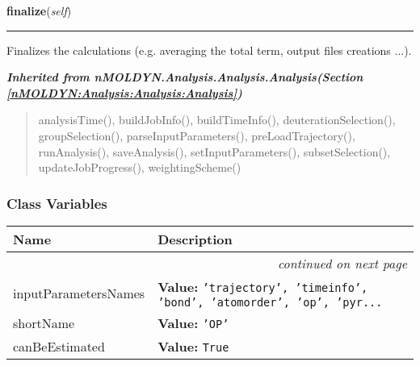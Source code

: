     \label{nMOLDYN:Analysis:NMR:OrderParameter:finalize}

    \vspace{0.5ex}

\hspace{.8\funcindent}\begin{boxedminipage}{\funcwidth}

    \raggedright \textbf{finalize}(\textit{self})

    \vspace{-1.5ex}

    \rule{\textwidth}{0.5\fboxrule}
\setlength{\parskip}{2ex}
    Finalizes the calculations (e.g. averaging the total term, output files
    creations ...).

\setlength{\parskip}{1ex}
    \end{boxedminipage}


\large{\textbf{\textit{Inherited from nMOLDYN.Analysis.Analysis.Analysis\textit{(Section \ref{nMOLDYN:Analysis:Analysis:Analysis})}}}}

\begin{quote}
analysisTime(), buildJobInfo(), buildTimeInfo(), deuterationSelection(), groupSelection(), parseInputParameters(), preLoadTrajectory(), runAnalysis(), saveAnalysis(), setInputParameters(), subsetSelection(), updateJobProgress(), weightingScheme()
\end{quote}


  \subsubsection{Class Variables}

    \vspace{-1cm}
\hspace{\varindent}\begin{longtable}{|p{\varnamewidth}|p{\vardescrwidth}|l}
\cline{1-2}
\cline{1-2} \centering \textbf{Name} & \centering \textbf{Description}& \\
\cline{1-2}
\endhead\cline{1-2}\multicolumn{3}{r}{\small\textit{continued on next page}}\\\endfoot\cline{1-2}
\endlastfoot\raggedright i\-n\-p\-u\-t\-P\-a\-r\-a\-m\-e\-t\-e\-r\-s\-N\-a\-m\-e\-s\- & \raggedright \textbf{Value:} 
{\tt 'trajectory', 'timeinfo', 'bond', 'atomorder', 'op', 'pyr\texttt{...}}&\\
\cline{1-2}
\raggedright s\-h\-o\-r\-t\-N\-a\-m\-e\- & \raggedright \textbf{Value:} 
{\tt 'OP'}&\\
\cline{1-2}
\raggedright c\-a\-n\-B\-e\-E\-s\-t\-i\-m\-a\-t\-e\-d\- & \raggedright \textbf{Value:} 
{\tt True}&\\
\cline{1-2}
\end{longtable}

